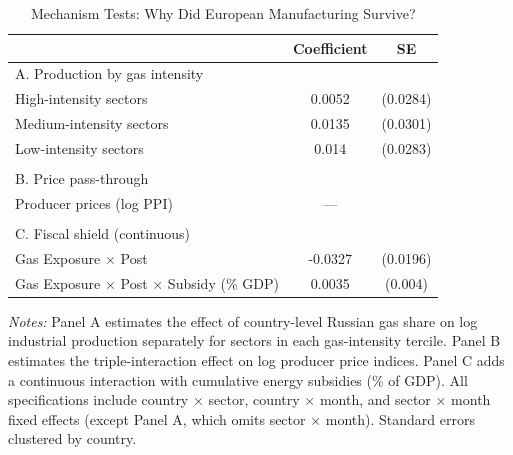 \begin{table}[htbp]
\centering
\caption{Mechanism Tests: Why Did European Manufacturing Survive?}
\label{tab:mechanisms}
\begin{tabular}{lcc}
\hline\hline
 & Coefficient & SE \\
\hline
A. Production by gas intensity &  &  \\
  High-intensity sectors & 0.0052 & (0.0284) \\
  Medium-intensity sectors & 0.0135 & (0.0301) \\
  Low-intensity sectors & 0.014 & (0.0283) \\
 &  &  \\
B. Price pass-through &  &  \\
  Producer prices (log PPI) & --- &  \\
 &  &  \\
C. Fiscal shield (continuous) &  &  \\
  Gas Exposure $\times$ Post & -0.0327 & (0.0196) \\
  Gas Exposure $\times$ Post $\times$ Subsidy (\% GDP) & 0.0035 & (0.004) \\
\hline\hline
\end{tabular}
\begin{minipage}{0.95\textwidth}
\footnotesize
\textit{Notes:} Panel A estimates the effect of country-level Russian gas share on log industrial production separately for sectors in each gas-intensity tercile. Panel B estimates the triple-interaction effect on log producer price indices. Panel C adds a continuous interaction with cumulative energy subsidies (\% of GDP). All specifications include country $\times$ sector, country $\times$ month, and sector $\times$ month fixed effects (except Panel A, which omits sector $\times$ month). Standard errors clustered by country.
\end{minipage}
\end{table}

